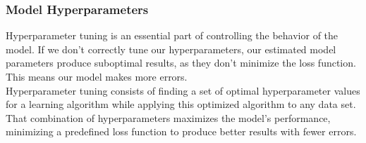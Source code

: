 \subsubsection{Model Hyperparameters} 
Hyperparameter tuning is an essential part of controlling the behavior of the  model. If we don’t correctly tune our hyperparameters, our estimated model parameters produce suboptimal results, as they don’t minimize the loss function. This means our model makes more errors.\\
Hyperparameter tuning consists of finding a set of optimal hyperparameter values for a learning algorithm while applying this optimized algorithm to any data set. That combination of hyperparameters maximizes the model’s performance, minimizing a predefined loss function to produce better results with fewer errors.\\


